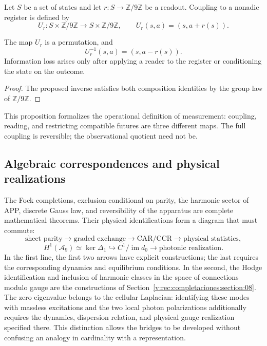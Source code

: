 Let \(S\) be a set of states and let \(r:S\to\mathbb Z/9\mathbb Z\) be a
readout. Coupling to a nonadic register is defined by
\[
 U_r:S\times\mathbb Z/9\mathbb Z\longrightarrow
 S\times\mathbb Z/9\mathbb Z,
 \qquad
 U_r(s,a)=(s,a+r(s)).
\]

\begin{proposition}
\label{v:rec:completaciones:statement:05}
The map \(U_r\) is a permutation, and
\[
 U_r^{-1}(s,a)=(s,a-r(s)).
\]
Information loss arises only after applying a reader to the
register or conditioning the state on the outcome.
\end{proposition}

\begin{proof}
The proposed inverse satisfies both composition identities by the
group law of \(\mathbb Z/9\mathbb Z\).
\end{proof}

This proposition formalizes the operational definition of measurement: coupling,
reading, and restricting compatible futures are three different maps. The
full coupling is reversible; the observational quotient need not be.

\subsection{Algebraic correspondences and physical realizations}
\label{v:rec:completaciones:section:11}

The Fock completions, exclusion conditional on parity, the harmonic
sector of APP, discrete Gauss law, and reversibility of the apparatus are complete
mathematical theorems. Their physical identifications form a diagram that
must commute:
\[
 \text{sheet parity}
 \longrightarrow\text{graded exchange}
 \longrightarrow\text{CAR/CCR}
 \longrightarrow\text{physical statistics},
\]
\[
 H^1(\mathcal A_9)\simeq\ker\Delta_1
 \hookrightarrow C^1/\operatorname{im}d_0
 \longrightarrow\text{photonic realization}.
\]
In the first line, the first two arrows have explicit
constructions; the last requires the corresponding dynamics and equilibrium
conditions. In the second, the Hodge identification and inclusion
of harmonic classes in the space of connections modulo gauge are the
constructions of Section~\ref{v:rec:completaciones:section:08}. The zero
eigenvalue belongs to the cellular Laplacian: identifying these modes with massless
excitations and the two local photon polarizations additionally requires the
dynamics, dispersion relation, and physical gauge realization specified
there. This distinction allows the bridges to be developed without confusing an
analogy in cardinality with a representation.
